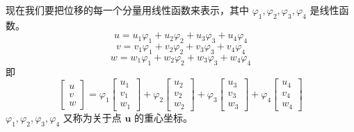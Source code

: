 \documentclass[12pt,a4paper]{article}
\begin{document}
现在我们要把位移的每一个分量用线性函数来表示，其中 $\varphi_1,\varphi_2,\varphi_3,\varphi_4$ 是线性函数。
$$
u=u_1\varphi_1+u_2\varphi_2+u_3\varphi_3+u_4\varphi_4
$$
$$
v=v_1\varphi_1+v_2\varphi_2+v_3\varphi_3+v_4\varphi_4
$$
$$
w=w_1\varphi_1+w_2\varphi_2+w_3\varphi_3+w_4\varphi_4
$$
即
$$
\begin{bmatrix}
u \\
v \\
w
\end{bmatrix}=\varphi_1\begin{bmatrix}
u_1 \\
v_1 \\
w_1
\end{bmatrix}+\varphi_2\begin{bmatrix}
u_2 \\
v_2 \\
w_2
\end{bmatrix}+\varphi_3\begin{bmatrix}
u_3 \\
v_3 \\
w_3
\end{bmatrix}+\varphi_4\begin{bmatrix}
u_4 \\
v_4 \\
w_4
\end{bmatrix}
$$
$\varphi_1,\varphi_2,\varphi_3,\varphi_4$ 又称为关于点 $\boldsymbol{u}$ 的重心坐标。











































































%
\end{document}
